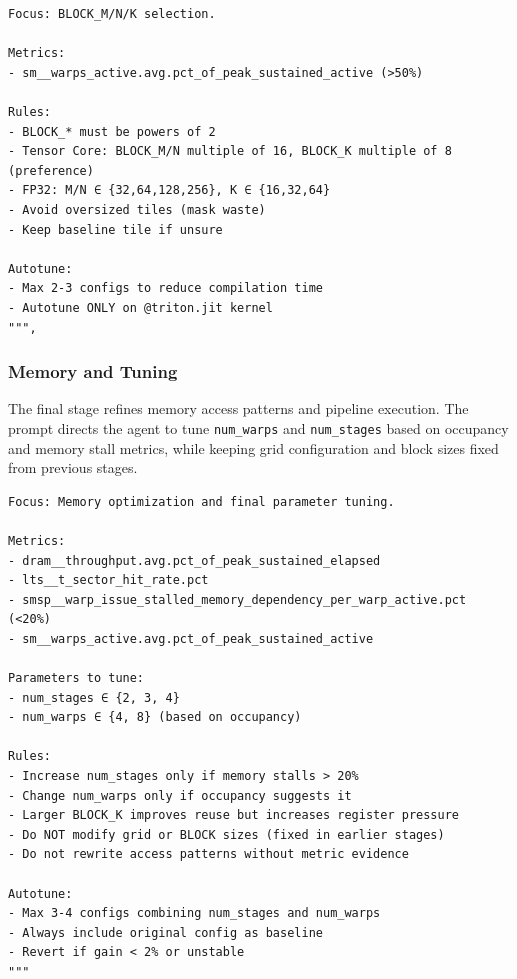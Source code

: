 \begin{mdframed}[linewidth=1pt, linecolor=black, backgroundcolor=gray!5]
\begin{lstlisting}
Focus: BLOCK_M/N/K selection.

Metrics:
- sm__warps_active.avg.pct_of_peak_sustained_active (>50%)

Rules:
- BLOCK_* must be powers of 2
- Tensor Core: BLOCK_M/N multiple of 16, BLOCK_K multiple of 8 (preference)
- FP32: M/N ∈ {32,64,128,256}, K ∈ {16,32,64}
- Avoid oversized tiles (mask waste)
- Keep baseline tile if unsure

Autotune:
- Max 2-3 configs to reduce compilation time
- Autotune ONLY on @triton.jit kernel
""",
\end{lstlisting}
\end{mdframed}

\subsubsection{Memory and Tuning}

The final stage refines memory access patterns and pipeline execution. The prompt directs the agent to tune \texttt{num\_warps} and \texttt{num\_stages} based on occupancy and memory stall metrics, while keeping grid configuration and block sizes fixed from previous stages.

\begin{mdframed}[linewidth=1pt, linecolor=black, backgroundcolor=gray!5]
\begin{lstlisting}
Focus: Memory optimization and final parameter tuning.

Metrics:
- dram__throughput.avg.pct_of_peak_sustained_elapsed
- lts__t_sector_hit_rate.pct
- smsp__warp_issue_stalled_memory_dependency_per_warp_active.pct (<20%)
- sm__warps_active.avg.pct_of_peak_sustained_active

Parameters to tune:
- num_stages ∈ {2, 3, 4}
- num_warps ∈ {4, 8} (based on occupancy)

Rules:
- Increase num_stages only if memory stalls > 20%
- Change num_warps only if occupancy suggests it
- Larger BLOCK_K improves reuse but increases register pressure
- Do NOT modify grid or BLOCK sizes (fixed in earlier stages)
- Do not rewrite access patterns without metric evidence

Autotune:
- Max 3-4 configs combining num_stages and num_warps
- Always include original config as baseline
- Revert if gain < 2% or unstable
"""
\end{lstlisting}
\end{mdframed}

